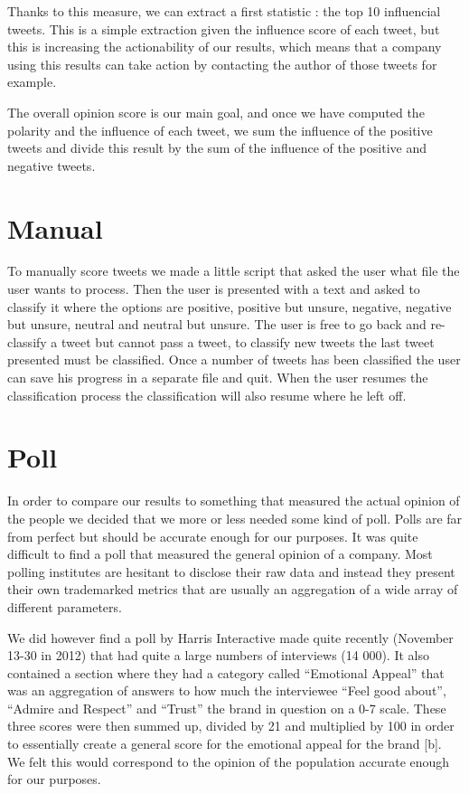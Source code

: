 \documentclass[a4paper,12pt]{report}
\begin{document}
Thanks to this measure, we can extract a first statistic : the top 10 influencial tweets. This is a simple extraction given the influence score of each tweet, but this is increasing the actionability of our results, which means that a company using this results can take action by contacting the author of those tweets for example.

The overall opinion score is our main goal, and once we have computed the polarity and the influence of each tweet, we sum the influence of the positive tweets and divide this result by the sum of the influence of the positive and negative tweets.

\section{Manual}

To manually score tweets we made a little script that asked the user what file the user wants to process. 
Then the user is presented with a text and asked to classify it where the options are positive, positive but unsure, negative, negative but unsure, neutral and neutral but unsure. 
The user is free to go back and re-classify a tweet but cannot pass a tweet, to classify new tweets the last tweet presented must be classified. 
Once a number of tweets has been classified the user can save his progress in a separate file and quit. 
When the user resumes the classification process the classification will also resume where he left off.

\section{Poll}

In order to compare our results to something that measured the actual opinion of the people we decided that we more or less needed some kind of poll. 
Polls are far from perfect but should be accurate enough for our purposes. It was quite difficult to find a poll that measured the general opinion of a company. 
Most polling institutes are hesitant to disclose their raw data and instead they present their own trademarked metrics that are usually an aggregation of a wide array of different parameters.

We did however find a poll by Harris Interactive made quite recently (November 13-30 in 2012) that had quite a large numbers of interviews (14 000). 
It also contained a section where they had a category called “Emotional Appeal” that was an aggregation of answers to how much the interviewee “Feel good about”, “Admire and Respect” and “Trust” the brand in question on a 0-7 scale. 
These three scores were then summed up, divided by 21 and multiplied by 100 in order to essentially create a general score for the emotional appeal for the brand [b]. 
We felt this would correspond to the opinion of the population accurate enough for our purposes.
\end{document}
